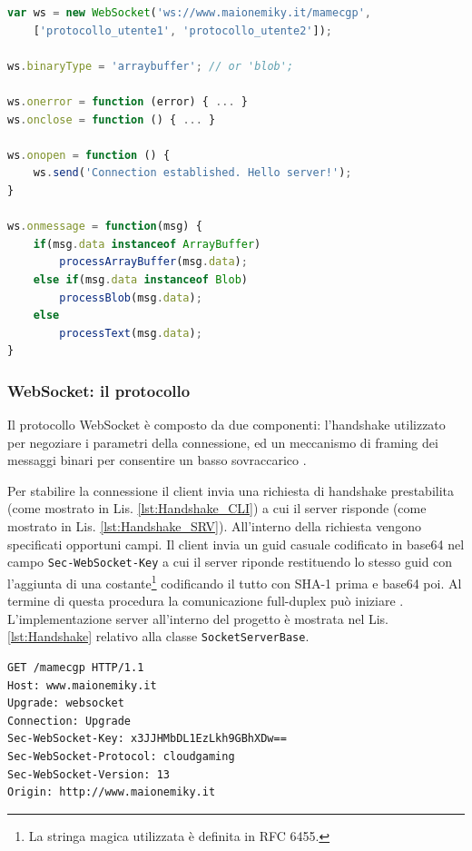 \begin{lstlisting}[language=JavaScript, caption=Esempio di codice delle API WebSocket, label={lst:WebSocketAPI}]
var ws = new WebSocket('ws://www.maionemiky.it/mamecgp', 
	['protocollo_utente1', 'protocollo_utente2']);

ws.binaryType = 'arraybuffer'; // or 'blob';

ws.onerror = function (error) { ... } 
ws.onclose = function () { ... } 

ws.onopen = function () { 
	ws.send('Connection established. Hello server!'); 
}

ws.onmessage = function(msg) { 
	if(msg.data instanceof ArrayBuffer)
		processArrayBuffer(msg.data);
	else if(msg.data instanceof Blob)
		processBlob(msg.data);
	else
		processText(msg.data);	
}
\end{lstlisting}

\subsubsection{WebSocket: il protocollo}
Il protocollo WebSocket è composto da due componenti: l'handshake utilizzato per negoziare i parametri della connessione, ed un meccanismo di framing dei messaggi binari per consentire un basso sovraccarico \parencite{High_Performance_Browser_Networking}.

Per stabilire la connessione il client invia una richiesta di handshake prestabilita (come mostrato in Lis. \ref{lst:Handshake_CLI}) a cui il server risponde (come mostrato in Lis. \ref{lst:Handshake_SRV}). All'interno della richiesta vengono specificati opportuni campi. Il client invia un guid casuale codificato in base64 nel campo \verb|Sec-WebSocket-Key| a cui il server riponde restituendo lo stesso guid con l'aggiunta di una costante\footnote{La stringa magica utilizzata è definita in RFC 6455.} codificando il tutto con SHA-1 prima e base64 poi. Al termine di questa procedura la comunicazione full-duplex può iniziare \parencite{Writing_WebSocket_servers}. L'implementazione server all'interno del progetto è mostrata nel Lis. \ref{lst:Handshake} relativo alla classe \verb|SocketServerBase|.

\begin{lstlisting}[language=HTML, caption=Richiesta handshake da parte del client, label={lst:Handshake_CLI}]
GET /mamecgp HTTP/1.1
Host: www.maionemiky.it
Upgrade: websocket
Connection: Upgrade
Sec-WebSocket-Key: x3JJHMbDL1EzLkh9GBhXDw==	
Sec-WebSocket-Protocol: cloudgaming
Sec-WebSocket-Version: 13
Origin: http://www.maionemiky.it
\end{lstlisting}

